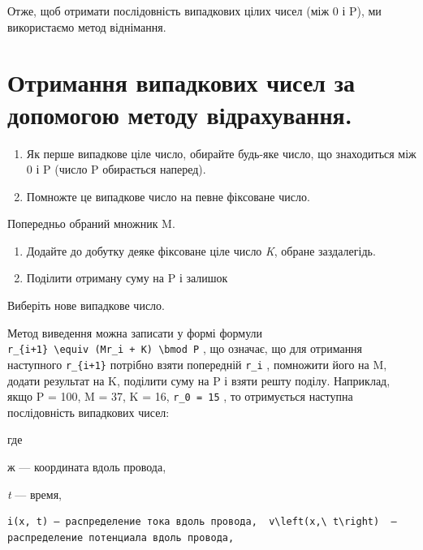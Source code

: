 \documentclass[
  ukrainian,
]{article}
\begin{document}
Отже, щоб отримати послідовність випадкових цілих чисел (між 0 і P), ми
використаємо метод віднімання.

\section{Отримання випадкових чисел за допомогою методу
відрахування.}\label{ux43eux442ux440ux438ux43cux430ux43dux43dux44f-ux432ux438ux43fux430ux434ux43aux43eux432ux438ux445-ux447ux438ux441ux435ux43b-ux437ux430-ux434ux43eux43fux43eux43cux43eux433ux43eux44e-ux43cux435ux442ux43eux434ux443-ux432ux456ux434ux440ux430ux445ux443ux432ux430ux43dux43dux44f.}

\begin{enumerate}
\def\labelenumi{\arabic{enumi}.}
\item
  Як перше випадкове ціле число, обирайте будь-яке число, що знаходиться
  між 0 і P (число P обирається наперед).
\item
  Помножте це випадкове число на певне фіксоване число.
\end{enumerate}

Попередньо обраний множник M.

\begin{enumerate}
\def\labelenumi{\arabic{enumi}.}
\setcounter{enumi}{2}
\item
  Додайте до добутку деяке фіксоване ціле число \emph{K}, обране
  заздалегідь.
\item
  Поділити отриману суму на P і залишок
\end{enumerate}

Виберіть нове випадкове число.

Метод виведення можна записати у формі формули
\texttt{r\_\{i+1\}\ \textbackslash{}equiv\ (Mr\_i\ +\ K)\ \textbackslash{}bmod\ P}
, що означає, що для отримання наступного \texttt{r\_\{i+1\}} потрібно
взяти попередній \texttt{r\_i} , помножити його на M, додати результат
на K, поділити суму на P і взяти решту поділу. Наприклад, якщо P = 100,
M = 37, K = 16, \texttt{r\_0\ =\ 15} , то отримується наступна
послідовність випадкових чисел:

где

ж --- координата вдоль провода,

\emph{t} --- время,

\begin{verbatim}
i(x, t) — распределение тока вдоль провода,  v\left(x,\ t\right)  — распределение потенциала вдоль провода,
\end{verbatim}
\end{document}
